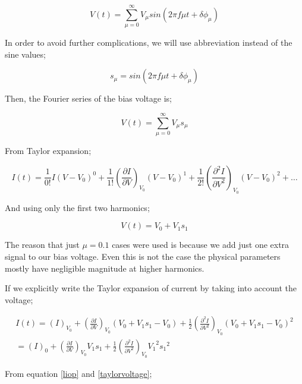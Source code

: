 \documentclass[10pt,a4paper,notitlepage]{article}
\begin{document}
\begin{equation}
  \label{}
  V(t)=\sum_{\mu=0}^{\infty}V_\mu sin(2 \pi f \mu t + \delta \phi_\mu)
\end{equation}

In order to avoid further complications, we will use abbreviation instead of the
sine values;

\begin{equation}
  s_\mu=sin(2 \pi f \mu t+\delta \phi_\mu)
\end{equation}

Then, the Fourier series of the bias voltage is;

\begin{equation}
  V(t)=\sum_{\mu=0}^{\infty} V_\mu s_\mu
\end{equation}

From Taylor expansion;

\begin{equation}
  I(t)=\frac{1}{0!}I(V-V_0)^0+\frac{1}{1!} \left(\frac{\partial I}{\partial V}\right)_{V_0} (V-V_0)^1 +\frac{1}{2!} \left(\frac{\partial^2 I}{\partial V^2}\right)_{V_0} (V-V_0)^2 + \ldots
\end{equation}

And using only the first two harmonics;

\begin{equation}
  V(t)=V_0+V_1 s_1
\end{equation}

The reason that just $\mu=0.1$ cases were used is because we add just one extra
signal to our bias voltage. Even this is not the case the physical parameters mostly
have negligible magnitude at higher harmonics.

If we explicitly write the Taylor expansion of current by taking into account
the voltage;

\begin{equation}
  \label{taylorvoltage}
  \begin{split}
    I(t)=(I)_{V_0}+\left(\frac{\partial I}{\partial V}\right)_{V_0} (V_0+V_1 s_1-V_0) +\frac{1}{2} \left(\frac{\partial^2 I}{\partial V^2}\right)_{V_0} (V_0+V_1 s_1-V_0)^2 \\
    =(I)_{0}+\left(\frac{\partial I}{\partial V}\right)_{V_0} V_1 s_1 +\frac{1}{2} \left(\frac{\partial^2 I}{\partial V^2}\right)_{V_0} {V_1}^2 {s_1}^2
  \end{split}
\end{equation}

From equation \ref{liop} and \ref{taylorvoltage};
\end{document}
